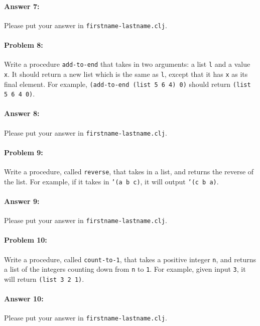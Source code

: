 \documentclass[10pt]{article}
\begin{document}
\paragraph{Answer 7:} Please put your answer in \texttt{firstname-lastname.clj}.

\hrulefill
\paragraph{Problem 8:}
  Write a procedure \texttt{add-to-end} that takes in two arguments: a
  list \texttt{l} and a value \texttt{x}. It should return a new list
  which is the same as \texttt{l}, except that it has \texttt{x} as
  its final element. For example, \texttt{(add-to-end (list 5 6 4) 0)}
  should return \texttt{(list 5 6 4 0)}.

\paragraph{Answer 8:} Please put your answer in \texttt{firstname-lastname.clj}.

\hrulefill
\paragraph{Problem 9:}
  Write a procedure, called \texttt{reverse}, that takes in a list, and returns
  the reverse of the list. For example, if it takes in \texttt{'(a b c)}, it
  will output \texttt{'(c b a)}.

\paragraph{Answer 9:} Please put your answer in \texttt{firstname-lastname.clj}.

\hrulefill
\paragraph{Problem 10:}
  Write a procedure, called \texttt{count-to-1}, that takes a positive
  integer \texttt{n}, and returns a list of the integers counting down
  from \texttt{n} to \texttt{1}. For example, given input \texttt{3},
  it will return \texttt{(list 3 2 1)}.

\paragraph{Answer 10:} Please put your answer in \texttt{firstname-lastname.clj}.

\hrulefill
\end{document}
